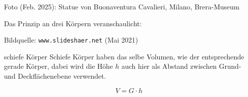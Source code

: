 {\footnotesize {Foto (Feb. 2025): Statue von Buonaventura
      Cavalieri, Milano, Brera-Museum}}

\vspace{4mm}

Das Prinzip an drei Körpern veranschaulicht:

Bildquelle: \texttt{www.slideshaer.net} (Mai 2021)
\vspace{9mm}

\begin{gesetz}{schiefe Körper}{}
  Schiefe Körper haben das selbe Volumen, wie der entsprechende gerade Körper, dabei wird die Höhe $h$ auch hier als Abstand zwischen Grund- und Deckflächenebene verwendet.

  $$V = G\cdot{} h$$
\end{gesetz}

\newpage
